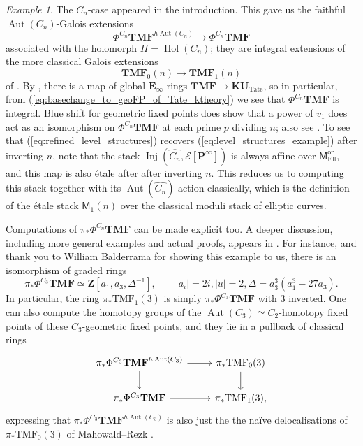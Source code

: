 \documentclass[11pt, a4paper]{article}
\newcommand{\Ell}{\mathrm{Ell}}
\newcommand{\ori}{\mathrm{or}}
\newcommand{\Tate}{\mathrm{Tate}}
\newcommand{\1}{\mathbf{1}}
\newcommand{\gKU}{{\mathbf{KU}}}
\newcommand{\gTMF}{{\mathbf{TMF}}}
\newcommand{\TMF}{\mathrm{TMF}}
\DeclareMathOperator{\Hol}{Hol}
\DeclareMathOperator{\Inj}{Inj}
\DeclareMathOperator{\Aut}{Aut}
\newcommand{\dual}[1]{{\widehat{#1}}}
\newcommand{\E}{\mathbf{E}}
\newcommand{\calE}{\mathcal{E}}
\newcommand{\M}{\mathsf{M}}
\renewcommand{\P}{\mathbf{P}}
\newcommand{\Z}{\mathbf{Z}}
\theoremstyle{plain}
\theoremstyle{definition}
\theoremstyle{remark}\numberwithin{equation}{section}
\newtheorem{example}[equation]{Example}
\begin{document}
\begin{example}\label{ex:subforTMFgamma1(n)}
The $C_n$-case appeared in the introduction. This gave us the faithful $\Aut(C_n)$-Galois extensions
\begin{equation}\label{eq:refined_level_structures}
    \Phi^{C_n} \gTMF^{h\Aut(C_n)} \to \Phi^{C_n} \gTMF
\end{equation}
associated with the holomorph $H=\Hol(C_n)$; they are integral extensions of the more classical Galois extensions
\begin{equation}\label{eq:level_structures_example}
    \gTMF_0(n) \to \gTMF_1(n)
\end{equation} 
of \cite[]{akhilandlennart}. By \cite[Thm.C]{globaltate}, there is a map of global $\E_\infty$-rings $\gTMF \to \gKU_\Tate$, so in particular, from (\ref{eq:basechange_to_geoFP_of_Tate_ktheory}) we see that $\Phi^{C_n} \gTMF$ is integral. Blue shift for geometric fixed points \cite[Cor.G]{temperedglobal} does show that a power of $v_1$ does act as an isomorphism on $\Phi^{C_n} \gTMF$ at each prime $p$ dividing $n$; also see \cite[Ex.5.5.20]{temperedglobal}. To see that (\ref{eq:refined_level_structures}) recovers (\ref{eq:level_structures_example}) after inverting $n$, note that the stack $\Inj(\dual{C_n},\calE[\P^\infty])$ is always affine over $\M_\Ell^\ori$, and this map is also étale after after inverting $n$. This reduces us to computing this stack together with its $\Aut(\dual{C_n})$-action classically, which is the definition of the étale stack $\M_1(n)$ over the classical moduli stack of elliptic curves. 
\end{example}

Computations of $\pi_\ast \Phi^{C_n} \gTMF$ can be made explicit too. A deeper discussion, including more general examples and actual proofs, appears in \cite{geometricnorms}. For instance, and thank you to William Balderrama for showing this example to us, there is an isomorphism of graded rings
    \[\pi_\ast \Phi^{C_3} \gTMF \simeq \Z[a_1, a_3, \Delta^{-1}], \qquad  |a_i|=2i, |u|=2, \Delta = a_3^3(a_1^3-27a_3).\]
In particular, the ring $\pi_\ast \TMF_1(3)$ is simply $\pi_\ast \Phi^{C_3} \gTMF$ with $3$ inverted. One can also compute the homotopy groups of the $\Aut(C_3) \simeq C_2$-homotopy fixed points of these $C_3$-geometric fixed points, and they lie in a pullback of classical rings
    \[\begin{tikzcd}
        {\pi_\ast \Phi^{C_3} \gTMF^{h\Aut(C_3)}}\ar[r]\ar[d] &   {\pi_\ast \TMF_0(3)}\ar[d] \\
        {\pi_\ast \Phi^{C_3} \gTMF}\ar[r] &   {\pi_\ast \TMF_1(3),}
    \end{tikzcd}\]
expressing that $\pi_\ast \Phi^{C_3} \gTMF^{h\Aut(C_3)}$ is also just the the naïve delocalisations of $\pi_\ast\TMF_0(3)$ of Mahowald--Rezk \cite{levelonethree}.
\end{document}
